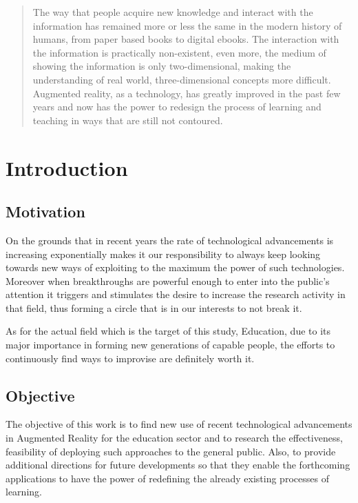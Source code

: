 \documentclass[12 pct]{report}
\begin{document}
\begin{abstract}
The way that people acquire new knowledge and interact with the information has remained more or less the same in the modern history of humans, from paper based books to digital ebooks. The interaction with the information is practically non-existent, even more, the medium of showing the information is only two-dimensional, making the understanding of real world, three-dimensional concepts more difficult. Augmented reality, as a technology, has greatly improved in the past few years and now has the power to redesign the process of learning and teaching in ways that are still not contoured.
\end{abstract}

\tableofcontents

\listoffigures

\listoftables

\chapter{Introduction}

\section{Motivation}
On the grounds that in recent years the rate of technological advancements is increasing exponentially makes it our responsibility to always keep looking towards new ways of exploiting to the maximum the power of such technologies. Moreover when breakthroughs are powerful enough to enter into the public's attention it triggers and stimulates the desire to increase the research activity in that field, thus forming a circle that is in our interests to not break it.

As for the actual field which is the target of this study, Education, due to its major importance in forming new generations of capable people, the efforts to continuously find ways to improvise are definitely worth  it. 

\section{Objective}
The objective of this work is to find new use of recent technological advancements in Augmented Reality for the education sector and to research the effectiveness, feasibility of deploying such approaches to the general public. Also, to provide additional directions for future developments so that they enable the  forthcoming applications to have the power of redefining the already existing processes of learning.
\end{document}

